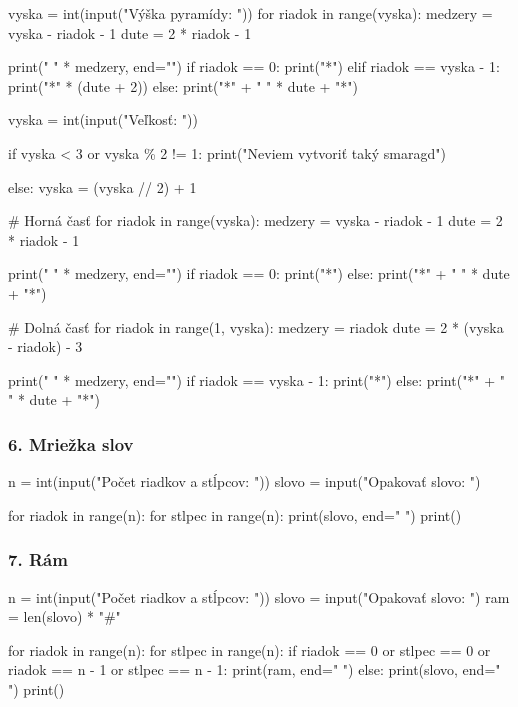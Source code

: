 \begin{solution}
vyska = int(input("Výška pyramídy: "))
for riadok in range(vyska):
    medzery = vyska - riadok - 1
    dute = 2 * riadok - 1

    print(" " * medzery, end="")
    if riadok == 0:
        print("*")
    elif riadok == vyska - 1:
        print("*" * (dute + 2))
    else:
        print("*" + " " * dute + "*")
\end{solution}

\begin{solution}
vyska = int(input("Veľkosť: "))

if vyska < 3 or vyska \% 2 != 1:
    print("Neviem vytvoriť taký smaragd")

else:
    vyska = (vyska // 2) + 1

    # Horná časť
    for riadok in range(vyska):
        medzery = vyska - riadok - 1
        dute = 2 * riadok - 1

        print(" " * medzery, end="")
        if riadok == 0:
            print("*")
        else:
            print("*" + " " * dute + "*")

    # Dolná časť
    for riadok in range(1, vyska):
        medzery = riadok
        dute = 2 * (vyska - riadok) - 3

        print(" " * medzery, end="")
        if riadok == vyska - 1:
            print("*")
        else:
            print("*" + " " * dute + "*")
\end{solution}


\subsubsection*{6. Mriežka slov}
\begin{solution}
n = int(input("Počet riadkov a stĺpcov: "))
slovo = input("Opakovať slovo: ")

for riadok in range(n):
    for stlpec in range(n):
        print(slovo, end=" ")
    print()
\end{solution}


\subsubsection*{7. Rám}
\begin{solution}
n = int(input("Počet riadkov a stĺpcov: "))
slovo = input("Opakovať slovo: ")
ram = len(slovo) * "#"

for riadok in range(n):
    for stlpec in range(n):
        if riadok == 0 or stlpec == 0 or riadok == n - 1 or stlpec == n - 1:
            print(ram, end=" ")
        else:
            print(slovo, end=" ")
    print()
\end{solution}


